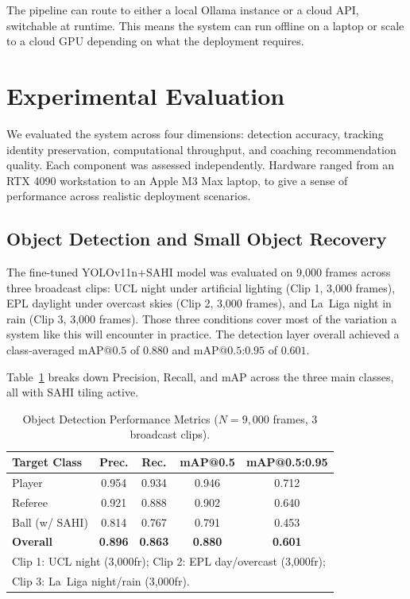 \documentclass[conference]{IEEEtran}
\begin{document}
The pipeline can route to either a local Ollama instance or a cloud API, switchable at runtime. This means the system can run offline on a laptop or scale to a cloud GPU depending on what the deployment requires.

\section{Experimental Evaluation}
\label{sec:experiments}

We evaluated the system across four dimensions: detection accuracy, tracking identity preservation, computational throughput, and coaching recommendation quality. Each component was assessed independently. Hardware ranged from an RTX 4090 workstation to an Apple M3 Max laptop, to give a sense of performance across realistic deployment scenarios.

\subsection{Object Detection and Small Object Recovery}

The fine-tuned YOLOv11n+SAHI model was evaluated on 9,000 frames across three broadcast clips: UCL night under artificial lighting (Clip 1, 3,000 frames), EPL daylight under overcast skies (Clip 2, 3,000 frames), and La~Liga night in rain (Clip 3, 3,000 frames). Those three conditions cover most of the variation a system like this will encounter in practice. The detection layer overall achieved a class-averaged $\text{mAP}@0.5$ of $0.880$ and $\text{mAP}@0.5\text{:}0.95$ of $0.601$.

Table~\ref{tab:detection} breaks down Precision, Recall, and mAP across the three main classes, all with SAHI tiling active.

\begin{table}[!t]
\caption{Object Detection Performance Metrics ($N = 9{,}000$ frames,
3 broadcast clips).}
\label{tab:detection}
\centering
\setlength{\tabcolsep}{4pt}
\begin{tabular}{lcccc}
\toprule
\textbf{Target Class} & \textbf{Prec.} & \textbf{Rec.}
  & \textbf{mAP@0.5} & \textbf{mAP@0.5:0.95} \\
\midrule
Player         & 0.954 & 0.934 & 0.946 & 0.712 \\
Referee        & 0.921 & 0.888 & 0.902 & 0.640 \\
Ball (w/ SAHI) & 0.814 & 0.767 & 0.791 & 0.453 \\
\midrule
\textbf{Overall} & \textbf{0.896} & \textbf{0.863}
  & \textbf{0.880} & \textbf{0.601} \\
\bottomrule
\multicolumn{5}{l}{\footnotesize Clip 1: UCL night (3,000fr);
  Clip 2: EPL day/overcast (3,000fr);} \\
\multicolumn{5}{l}{\footnotesize Clip 3: La~Liga night/rain (3,000fr).}
\end{tabular}
\end{table}
\end{document}
